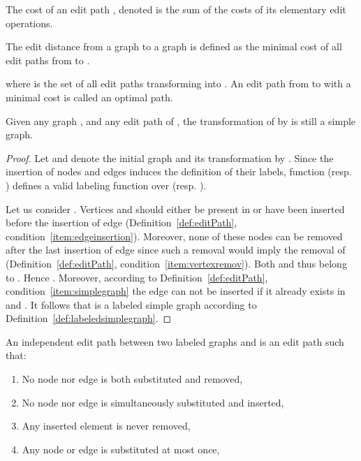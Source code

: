 \begin{definition}
  The cost of an edit path , denoted  is the sum of
  the costs of its elementary edit operations.
\end{definition}
\begin{definition}
  The edit distance from a graph  to a graph  is defined as
  the minimal cost of all edit paths from  to .
  
  where  is the set of all edit paths
  transforming  into . An edit path from  to  with a
  minimal cost is called an optimal path.
\end{definition}
\begin{proposition}
  \label{prop:resultEditPath}
  Given any graph , and any edit path  of , the
  transformation of  by  is still a simple graph. 
\end{proposition}
\begin{proof}
  Let  and  denote the
  initial graph and its transformation by . Since the insertion
  of nodes and edges induces the definition of their labels,
  function  (resp. ) defines a valid labeling function
  over  (resp. ). 

  Let us consider . Vertices  and  should either be
  present in  or have been inserted before the insertion of edge
   (Definition~\ref{def:editPath},
  condition~\ref{item:edgeinsertion}). Moreover, none of these nodes
  can be removed after the last insertion of edge  since such a
  removal would imply the removal of 
  (Definition~\ref{def:editPath}, condition~\ref{item:vertexremov}).
  Both  and  thus belong to .
Hence  . Moreover, according to
  Definition~\ref{def:editPath}, condition~\ref{item:simplegraph} the
  edge  can not be inserted if it already exists in  and
  .  It follows that  is a labeled
  simple graph according to Definition~\ref{def:labeledsimplegraph}.
\end{proof}
\begin{definition}
  \label{def:mineditpath}
  An independent edit path between two labeled graphs  and  is
  an edit path such that:
  \begin{enumerate}
  \item\label{item:subremov} No node nor edge is both substituted and
    removed,
  \item\label{item:subins} No node nor edge is simultaneously substituted and inserted,
  \item\label{item:insremov} Any inserted element is never removed,
  \item\label{intem:subsonce} Any node or edge is substituted at most
    once,
  \end{enumerate}    
\end{definition}
